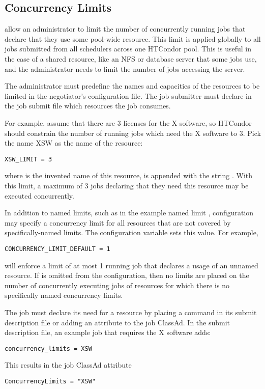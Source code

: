 \subsection{\label{sec:Concurrency-Limits}Concurrency Limits} 

 allow an administrator to limit the number
of concurrently running jobs that declare that they use some
pool-wide resource.  This limit is applied globally to all jobs
submitted from all schedulers across one HTCondor pool.  This is
useful in the case of a shared resource, like an NFS or database
server that some jobs use, and the administrator needs to limit the
number of jobs accessing the server.

The administrator must predefine the names and capacities of the
resources to be limited in the negotiator's configuration file.
The job submitter must declare in the job submit file which 
resources the job consumes.

For example, assume that there are 3 licenses for the X software,
so HTCondor should constrain the number of running jobs which need the
X software to 3.  Pick the name XSW as the name of the resource:

\begin{verbatim}
XSW_LIMIT = 3
\end{verbatim}
where  is the invented name of this resource,
is appended with the string .
With this limit, a maximum of 3 jobs declaring that they need this
resource may be executed concurrently.

In addition to named limits, such as in the example named limit ,
configuration may specify a concurrency limit for all resources
that are not covered by specifically-named limits.
The configuration variable  sets
this value.  For example,
\begin{verbatim}
CONCURRENCY_LIMIT_DEFAULT = 1
\end{verbatim}
will enforce a limit of at most 1 running job that declares a
usage of an unnamed resource.  If
 is omitted from the
configuration, then no limits are placed on the number of concurrently
executing jobs of resources for which there is no specifically named
concurrency limits.

The job must declare its need for a resource by placing a command
in its submit description file or adding an attribute to the
job ClassAd.
In the submit description file, an example job that requires
the X software adds:
\begin{verbatim}
concurrency_limits = XSW
\end{verbatim}
This results in the job ClassAd attribute
\begin{verbatim}
ConcurrencyLimits = "XSW"
\end{verbatim}

